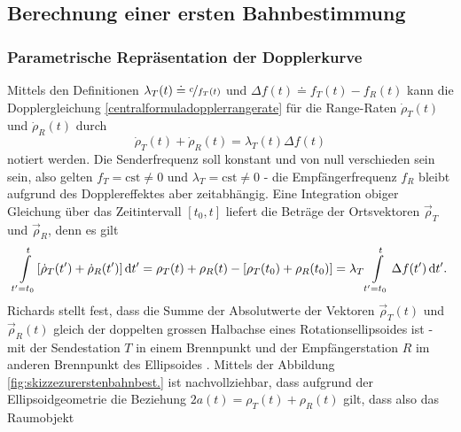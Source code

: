 \documentclass[a4paper,12pt]{article}
\numberwithin{equation}{section}
\begin{document}
\subsection{Berechnung einer ersten Bahnbestimmung}
\subsubsection{Parametrische Repräsentation der Dopplerkurve}
Mittels den Definitionen $\lambda_T(t) \doteq \nicefrac{c}{f_T(t)}$ und $\Delta f(t) \doteq f_T(t)-f_R(t)$ kann die Dopplergleichung \eqref{centralformuladopplerrangerate} für die Range-Raten $\dot{\rho}_T(t)$ und $\dot{\rho}_R(t)$ durch \begin{equation}\label{bererstbahndoppler}
\dot{\rho}_T(t) + \dot{\rho}_R(t) = \lambda_T(t)\Delta f(t)
\end{equation} notiert werden. Die Senderfrequenz soll konstant und von null verschieden sein sein, also gelten $f_T = \text{cst} \neq 0$ und $\lambda_T = \text{cst} \neq 0$ - die Empfängerfrequenz $f_R$ bleibt aufgrund des Dopplereffektes aber zeitabhängig. Eine Integration obiger Gleichung über das Zeitintervall $[t_0,t]$ liefert die Beträge der Ortsvektoren $\vec{\rho}_T$ und $\vec{\rho}_R$, denn es gilt \begin{equation}\label{eq:intdoppler1}
\int\displaylimits_{t^\prime = t_0}^{t} [\dot{\rho}_T(t^\prime)+\dot{\rho}_R(t^\prime)] \, \mathrm{d}t^\prime = \rho_T(t) + \rho_R(t) - [\rho_T(t_0)+\rho_R(t_0)]  = \lambda_T \int\displaylimits_{t^\prime = t_0}^{t} \Delta f(t^\prime)   \, \mathrm{d}t^\prime.
\end{equation} Richards stellt fest, dass die Summe der Absolutwerte der Vektoren $\vec{\rho}_T(t)$ und $\vec{\rho}_R(t)$ gleich der doppelten grossen Halbachse eines Rotationsellipsoides ist - mit der Sendestation $T$ in einem Brennpunkt und der Empfängerstation $R$ im anderen Brennpunkt des Ellipsoides \cite[S.1730]{Richards.1961}. Mittels der Abbildung \ref{fig:skizzezurerstenbahnbest.} ist nachvollziehbar, dass aufgrund der Ellipsoidgeometrie die Beziehung $2a(t) = \rho_T(t) + \rho_R(t)$ gilt, dass also das Raumobjekt
\end{document}
